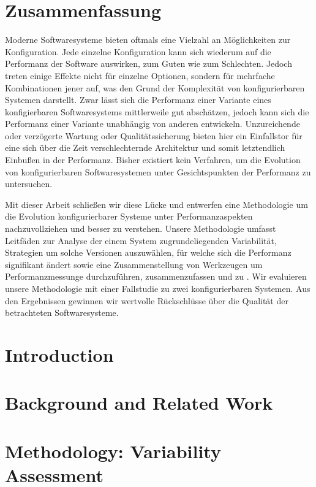 \documentclass[
	12pt,
	a4paper,
	oneside,
	openright,
	listof=totoc%
]{scrbook}
\begin{document}
\newpage
\chapter*{Zusammenfassung}
Moderne Softwaresysteme bieten oftmals eine Vielzahl an Möglichkeiten zur
Konfiguration. Jede einzelne Konfiguration kann sich wiederum auf die
Performanz der Software auswirken, zum Guten wie zum Schlechten. Jedoch treten
einige Effekte nicht für einzelne Optionen, sondern für mehrfache Kombinationen
jener auf, was den Grund der Komplexität von konfigurierbaren Systemen
darstellt. Zwar lässt sich die Performanz einer Variante eines konfigierbaren
Softwaresystems mittlerweile gut abschätzen, jedoch kann sich die Performanz
einer Variante unabhängig von anderen entwickeln. Unzureichende oder verzögerte
Wartung oder Qualitätssicherung bieten hier ein Einfallstor für eine sich über
die Zeit verschlechternde Architektur und somit letztendlich Einbußen in der
Performanz. Bisher existiert kein Verfahren, um die Evolution von
konfigurierbaren Softwaresystemen unter Gesichtspunkten der Performanz zu
untersuchen.

Mit dieser Arbeit schließen wir diese Lücke und entwerfen eine Methodologie um
die Evolution konfigurierbarer Systeme unter Performanzaspekten
nachzuvollziehen und besser zu verstehen. Unsere Methodologie umfasst Leitfäden
zur Analyse der einem System zugrundeliegenden Variabilität, Strategien um
solche Versionen auszuwählen, für welche sich die Performanz signifikant ändert
sowie eine Zusammenstellung von Werkzeugen um Performanzmessunge durchzuführen,
zusammenzufassen und zu . 
Wir evaluieren unsere Methodologie mit einer Fallstudie zu zwei konfigurierbaren Systemen. Aus den Ergebnissen
gewinnen wir wertvolle Rückschlüsse über die Qualität der betrachteten
Softwaresysteme.

\tableofcontents
\listoffigures
\listoftables
{}
\chapter{Introduction}\label{chapter:1}
\setcounter{page}{1}


\chapter{Background and Related Work}\label{chapter:2}


\chapter{Methodology: Variability Assessment}\label{sec:chapter:3}

\end{document}
